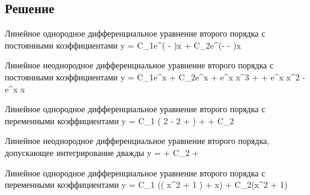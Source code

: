 \subsection{Решение}
\begin{enumerate}
    \solutionItemFirst
    	{\equationFirst}
    	{
    		Линейное однородное дифференциальное уравнение второго порядка 
    		с постоянными коэффициентами
    	}
    	{
    		y = C_1e^{\left(  -  \right)x } +
    			C_2e^{\left(- -  \right)x }
    	}
    
  	\clearpage
  	
  	\solutionItemFirst
	  	{\equationSecond}
	  	{
	  		Линейное неоднородное дифференциальное уравнение второго порядка 
	  		с постоянными коэффициентами
	  	}
	  	{
	  		y = C_1e^x + C_2e^x +
	  			 e^x x^3  + 
	  			+ \hspace{0.25em}  e^x x^2  -
	  			 e^x x 
	  	}
  	
	\vspace{1.5em}
  	
  	\solutionItemFirst
	  	{\equationThird}
	  	{
	  		Линейное однородное дифференциальное уравнение второго порядка
	  		с переменными коэффициентами
	  	}
	  	{
	  		y = C_1
	  		\left( 
	  			2 - 
	  			2 + 
	  		\right) +
	  		+ \hspace{0.25em} C_2
	  	}
  	
	\vspace{1.5em}
  	
	\solutionItemFirst
		{\equationFourth}
		{
			Линейное неоднородное дифференциальное уравнение второго порядка, 
			допускающее интегрирование дважды
		}
		{
			y =  + C_2 + 
		}
	
	\vspace{1.5em}  	
	
  	\solutionItemFirst
	  	{\equationFifth}
	  	{
	  		Линейное однородное дифференциальное уравнение второго порядка 
	  		с переменными коэффициентами
	  	}
	  	{
	  		y = C_1 (( x^2 + 1 ) + x) + C_2(x^2 + 1)
	  	}
  
\end{enumerate}
